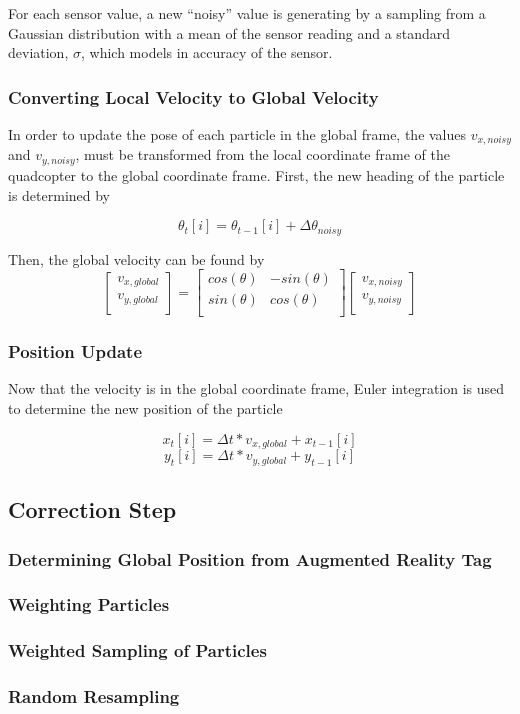 		For each sensor value, a new ``noisy'' value is generating by a sampling from a Gaussian distribution with a mean of the sensor reading and a standard deviation, $\sigma$, which models in accuracy of the sensor. 
	
	\subsubsection{Converting Local Velocity to Global Velocity}
		In order to update the pose of each particle in the global frame, the values $v_{x,noisy}$ and $v_{y,noisy}$, must be transformed from the local coordinate frame of the quadcopter to the global coordinate frame. First, the new heading of the particle is determined by

		\[\theta_t[i] = \theta_{t-1}[i]+ \Delta\theta_{noisy}\]

		Then, the global velocity can be found by
		\[
		\begin{bmatrix} 
		  v_{x, global}\\
		  v_{y, global}\\
		\end{bmatrix}
		=
		\begin{bmatrix} 
		  cos(\theta) & -sin(\theta)\\
		  sin(\theta) & cos(\theta)\\
		\end{bmatrix}
		\begin{bmatrix} 
		  v_{x, noisy}\\
		  v_{y, noisy}\\
		\end{bmatrix}
		\]

	\subsubsection{Position Update}
		Now that the velocity is in the global coordinate frame, Euler integration is used to determine the new position of the particle

		\[x_t[i] = \Delta t*v_{x, global} + x_{t-1}[i]\]
		\[y_t[i] = \Delta t*v_{y, global} + y_{t-1}[i]\]

\subsection{Correction Step}

	\subsubsection{Determining Global Position from Augmented Reality Tag}


	\subsubsection{Weighting Particles}


	\subsubsection{Weighted Sampling of Particles}

	\subsubsection{Random Resampling}



